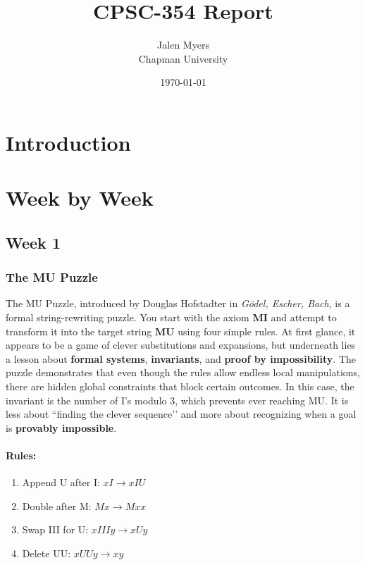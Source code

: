 \documentclass{article}
\title{CPSC-354 Report}
\author{Jalen Myers  \\ Chapman University}
\date{\today}
\theoremstyle{theorem}
\theoremstyle{definition}
\theoremstyle{remark}
\begin{document}
\maketitle

\begin{abstract}
\end{abstract}

\setcounter{tocdepth}{3}
\tableofcontents

\section{Introduction}\label{intro}

\section{Week by Week}\label{homework}

\subsection{Week 1}

\subsubsection{The MU Puzzle}
The MU Puzzle, introduced by Douglas Hofstadter in \textit{Gödel, Escher, Bach}, is a formal string-rewriting puzzle. You start with the axiom \textbf{MI} and attempt to transform it into the target string \textbf{MU} using four simple rules. At first glance, it appears to be a game of clever substitutions and expansions, but underneath lies a lesson about \textbf{formal systems}, \textbf{invariants}, and \textbf{proof by impossibility}. The puzzle demonstrates that even though the rules allow endless local manipulations, there are hidden global constraints that block certain outcomes. In this case, the invariant is the number of I's modulo 3, which prevents ever reaching MU. It is less about ``finding the clever sequence’’ and more about recognizing when a goal is \textbf{provably impossible}.

\paragraph{Rules:}
\begin{enumerate}
  \item Append U after I: \quad $xI \to xIU$
  \item Double after M: \quad $Mx \to Mxx$
  \item Swap III for U: \quad $xIIIy \to xUy$
  \item Delete UU: \quad $xUUy \to xy$
\end{enumerate}
\end{document}
